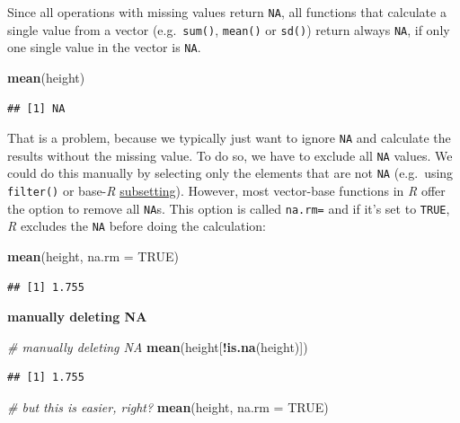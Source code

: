 \documentclass[
]{scrartcl}
\newenvironment{Shaded}{\begin{snugshade}}{\end{snugshade}}
\newcommand{\CommentTok}[1]{\textcolor[rgb]{0.56,0.35,0.01}{\textit{#1}}}
\newcommand{\DataTypeTok}[1]{\textcolor[rgb]{0.13,0.29,0.53}{#1}}
\newcommand{\KeywordTok}[1]{\textcolor[rgb]{0.13,0.29,0.53}{\textbf{#1}}}
\newcommand{\NormalTok}[1]{#1}
\newcommand{\OperatorTok}[1]{\textcolor[rgb]{0.81,0.36,0.00}{\textbf{#1}}}
\newcommand{\OtherTok}[1]{\textcolor[rgb]{0.56,0.35,0.01}{#1}}
\newenvironment{webexsolution}[1]
    {\par\tiny\textbf{#1}}
    {\par}
\newcommand{\webexhide}[1]{\begin{webexsolution}{#1}}
\begin{document}
Since all operations with missing values return \texttt{NA}, all functions that calculate a single value from a vector (e.g.~\texttt{sum()}, \texttt{mean()} or \texttt{sd()}) return always \texttt{NA}, if only one single value in the vector is \texttt{NA}.

\begin{Shaded}
\begin{Highlighting}[]
\KeywordTok{mean}\NormalTok{(height)}
\end{Highlighting}
\end{Shaded}

\begin{verbatim}
## [1] NA
\end{verbatim}

That is a problem, because we typically just want to ignore \texttt{NA} and calculate the results without the missing value. To do so, we have to exclude all \texttt{NA} values. We could do this manually by selecting only the elements that are not \texttt{NA} (e.g.~using \texttt{filter()} or base-\emph{R} \url{subsetting}). However, most vector-base functions in \emph{R} offer the option to remove all \texttt{NA}s. This option is called \texttt{na.rm=} and if it's set to \texttt{TRUE}, \emph{R} excludes the \texttt{NA} before doing the calculation:

\begin{Shaded}
\begin{Highlighting}[]
\KeywordTok{mean}\NormalTok{(height, }\DataTypeTok{na.rm =} \OtherTok{TRUE}\NormalTok{)}
\end{Highlighting}
\end{Shaded}

\begin{verbatim}
## [1] 1.755
\end{verbatim}

\webexhide{manually deleting NA}

\begin{Shaded}
\begin{Highlighting}[]
\CommentTok{\# manually deleting  NA}
\KeywordTok{mean}\NormalTok{(height[}\OperatorTok{!}\KeywordTok{is.na}\NormalTok{(height)])}
\end{Highlighting}
\end{Shaded}

\begin{verbatim}
## [1] 1.755
\end{verbatim}

\begin{Shaded}
\begin{Highlighting}[]
\CommentTok{\# but this is easier, right?}
\KeywordTok{mean}\NormalTok{(height, }\DataTypeTok{na.rm =} \OtherTok{TRUE}\NormalTok{)}
\end{Highlighting}
\end{Shaded}
\end{document}
